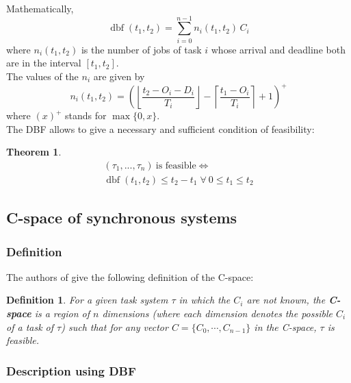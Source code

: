 \documentclass[times, 10pt,twocolumn, a4paper]{article}
\newtheorem{theorem}{Theorem}
\newtheorem{definition}{Definition}
\newcommand{\dbf}[1]{\operatorname{dbf}(#1)}
\begin{document}
  Mathematically,
  \[
    \dbf{t_1, t_2} = \sum_{i=0}^{n-1} n_i(t_1, t_2) \, C_i
  \]
  where $n_i(t_1, t_2)$ is the number of jobs of task $i$ whose arrival and
  deadline both are in the interval $[t_1, t_2]$.\\

The values of the $n_i$ are given by
\[
  n_i(t_1, t_2) = \left( \left\lfloor \frac{t_2 - O_i -
  D_i}{T_i} \right\rfloor - \left\lceil \frac{t_1 - O_i}{T_i} \right\rceil + 1 \right)^{+}
\]
where $(x)^+$ stands for $\max \{ 0, x \}$.\\

The DBF allows to give a necessary and sufficient condition of feasibility:

\begin{theorem}
\[
  \begin{array}{c}
    (\tau_1, ..., \tau_n) \: \text{is feasible}  \iff \\
    \dbf{t_1, t_2} \leq t_2 - t_1 \; \forall \: 0 \leq t_1 \leq t_2
  \end{array}
\]
\end{theorem}

  \subsection{C-space of synchronous systems}

    \subsubsection{Definition}

The authors of \cite{george2009characterization} give the following definition of the C-space:
\begin{definition}
For a given task system $\tau$ in which the $C_i$ are not known, the \textbf{C-space} is a region of $n$ dimensions (where each dimension denotes the possible $C_i$ of a task of $\tau$) such that for any vector $C = \{ C_0, \cdots, C_{n-1}\}$ in the C-space, $\tau$ is feasible.
\end{definition}


  \subsubsection{Description using DBF}
\end{document}
